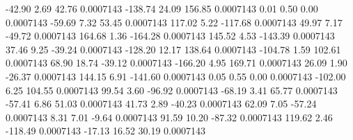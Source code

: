       -42.90        2.69       42.76     0.0007143
     -138.74       24.09      156.85     0.0007143
        0.01        0.50        0.00     0.0007143
      -59.69        7.32       53.45     0.0007143
      117.02        5.22     -117.68     0.0007143
       49.97        7.17      -49.72     0.0007143
      164.68        1.36     -164.28     0.0007143
      145.52        4.53     -143.39     0.0007143
       37.46        9.25      -39.24     0.0007143
     -128.20       12.17      138.64     0.0007143
     -104.78        1.59      102.61     0.0007143
       68.90       18.74      -39.12     0.0007143
     -166.20        4.95      169.71     0.0007143
       26.09        1.90      -26.37     0.0007143
      144.15        6.91     -141.60     0.0007143
        0.05        0.55        0.00     0.0007143
     -102.00        6.25      104.55     0.0007143
       99.54        3.60      -96.92     0.0007143
      -68.19        3.41       65.77     0.0007143
      -57.41        6.86       51.03     0.0007143
       41.73        2.89      -40.23     0.0007143
       62.09        7.05      -57.24     0.0007143
        8.31        7.01       -9.64     0.0007143
       91.59       10.20      -87.32     0.0007143
      119.62        2.46     -118.49     0.0007143
      -17.13       16.52       30.19     0.0007143
